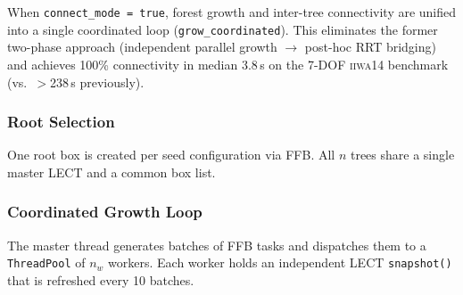 \documentclass[journal]{IEEEtran}
\begin{document}
When \texttt{connect\_mode = true}, forest growth and inter-tree
connectivity are unified into a single coordinated loop
(\texttt{grow\_coordinated}).  This eliminates the former two-phase
approach (independent parallel growth $\to$ post-hoc RRT bridging)
and achieves 100\% connectivity in median 3.8\,s on the 7-DOF
\textsc{iiwa14} benchmark (vs.\ $>$238\,s previously).

\subsubsection{Root Selection}

One root box is created per seed configuration via FFB.
All $n$ trees share a single master LECT and a common box list.

\subsubsection{Coordinated Growth Loop}

The master thread generates batches of FFB tasks and dispatches them
to a \texttt{ThreadPool} of $n_w$ workers.  Each worker holds an
independent LECT \texttt{snapshot()} that is refreshed every 10 batches.
\end{document}
